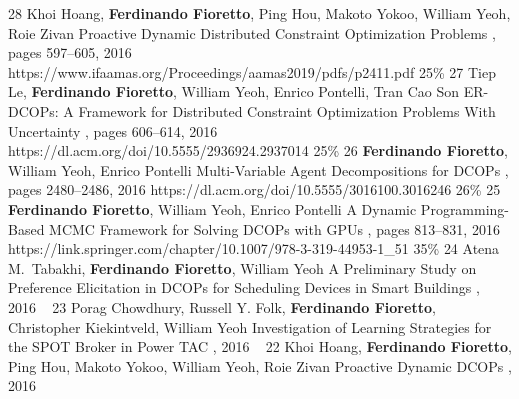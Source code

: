 \begin{pubs}

\confentry 
	{28} %
	{Khoi Hoang, {\bf Ferdinando Fioretto}, Ping Hou, Makoto Yokoo, William Yeoh, Roie Zivan}
	{Proactive Dynamic Distributed Constraint Optimization Problems} 
	{\procAAMAS, pages 597--605, 2016}
	{https://www.ifaamas.org/Proceedings/aamas2019/pdfs/p2411.pdf}
	{25\%}%
\confentry 
	{27} %
	{Tiep Le, {\bf Ferdinando Fioretto}, William Yeoh, Enrico Pontelli, Tran Cao Son} 
	{ER-DCOPs: A Framework for Distributed Constraint Optimization Problems With Uncertainty} 
	{\procAAMAS,	pages 606--614, 2016}
	{https://dl.acm.org/doi/10.5555/2936924.2937014}
	{25\%}%
\confentry 
	{26} %
	{{\bf Ferdinando Fioretto}, William Yeoh, Enrico Pontelli}
	{Multi-Variable Agent Decompositions for DCOPs}
	{\procAAAI, pages 2480--2486, 2016}
	{https://dl.acm.org/doi/10.5555/3016100.3016246}
	{26\%}%
\confentry
	{25} %
	{{\bf Ferdinando Fioretto}, William Yeoh, Enrico Pontelli}
	{A Dynamic Programming-Based MCMC Framework for Solving DCOPs with GPUs}
	{\procCP, pages 813--831,	2016}
	{https://link.springer.com/chapter/10.1007/978-3-319-44953-1\_51}
	{35\%}%
\wsentry
	{24} %
	{Atena M.~Tabakhi, {\bf Ferdinando Fioretto}, William Yeoh}
	{A Preliminary Study on Preference Elicitation in DCOPs for Scheduling Devices in Smart Buildings}
	{, 2016}
	{~}
\wsentry 
	{23} %
	{Porag Chowdhury, Russell Y. Folk, {\bf Ferdinando Fioretto}, Christopher Kiekintveld, William Yeoh}
	{Investigation of Learning Strategies for the SPOT Broker in Power TAC}
  	{, 2016}
	{~}
\wsentry 
	{22} %
	{Khoi Hoang, {\bf Ferdinando Fioretto}, Ping Hou, Makoto Yokoo, William Yeoh, Roie Zivan}
	{Proactive Dynamic DCOPs} 
	{, 2016}
	{~}	



\end{pubs}
